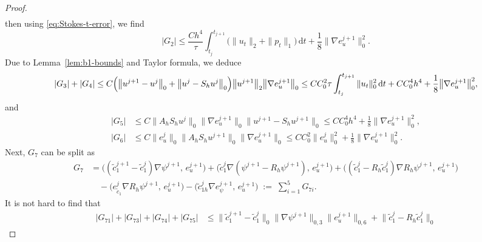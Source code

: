 \begin{proof}
\begin{align}
\end{align}
then using \eqref{eq:Stokes-t-error}, we find
\begin{equation}\label{eq:G2}
  |G_{2}| \leq \frac{Ch^{4}}{\tau}\int_{t_{j}}^{t_{j+1}}
               \bigl(\|u_{t}\|_{2} + \|p_{t}\|_{1}\bigr)\,\mathrm{d}t
             + \frac{1}{8}\bigl\|\nabla e_{u}^{j+1}\bigr\|_{0}^{2}.
\end{equation}
Due to Lemma~\ref{lem:b1-bounds} and Taylor formula, we deduce
\begin{equation}\label{eq:G3G4}
  |G_{3}| + |G_{4}|
  \leq C\Bigl(\bigl\|u^{j+1}-u^{j}\bigr\|_{0} + \bigl\|u^{j} - S_{h}u^{j}\bigr\|_{0}\Bigr)
        \bigl\|u^{j+1}\bigr\|_{2}\bigl\|\nabla e_{u}^{j+1}\bigr\|_{0}
  \leq CC_{0}^{2}\tau\int_{t_{j}}^{t_{j+1}}\|u_{t}\|_{0}^{2}\,\mathrm{d}t
     + CC_{0}^{4}h^{4}
     + \frac{1}{8}\bigl\|\nabla e_{u}^{j+1}\bigr\|_{0}^{2},
\end{equation}
and
\begin{align}
  |G_{5}| &\leq C\|A_{h}S_{h}u^{j}\|_{0}\bigl\|\nabla e_{u}^{j+1}\bigr\|_{0}
                  \bigl\|u^{j+1} - S_{h}u^{j+1}\bigr\|_{0}
           \leq CC_{0}^{4}h^{4} + \frac{1}{8}\bigl\|\nabla e_{u}^{j+1}\bigr\|_{0}^{2},
  \label{eq:G5}\\[4pt]
  |G_{6}| &\leq C\bigl\|e_{u}^{j}\bigr\|_{0}\|A_{h}S_{h}u^{j+1}\|_{0}
                  \bigl\|\nabla e_{u}^{j+1}\bigr\|_{0}
           \leq CC_{0}^{2}\bigl\|e_{u}^{j}\bigr\|_{0}^{2}
              + \frac{1}{8}\bigl\|\nabla e_{u}^{j+1}\bigr\|_{0}^{2}.
  \label{eq:G6}
\end{align}
Next, $G_{7}$ can be split as
\begin{align}
  G_{7} &= \bigl((\tilde{c}_{1}^{j+1} - \tilde{c}_{1}^{j})\nabla\psi^{j+1},\, e_{u}^{j+1}\bigr)
          + \bigl(\tilde{c}_{1}^{j}\nabla(\psi^{j+1} - R_{h}\psi^{j+1}),\, e_{u}^{j+1}\bigr)
          + \bigl((\tilde{c}_{1}^{j} - R_{h}\tilde{c}_{1}^{j})\nabla R_{h}\psi^{j+1},\, e_{u}^{j+1}\bigr)
  \nonumber\\
  &\quad - \bigl(e_{\tilde{c}_{1}}^{j}\nabla R_{h}\psi^{j+1},\, e_{u}^{j+1}\bigr)
          - \bigl(\tilde{c}_{1h}^{j}\nabla e_{\psi}^{j+1},\, e_{u}^{j+1}\bigr)
         \;:=\; \sum_{i=1}^{5}G_{7i}.
  \label{eq:G7-split}
\end{align}
It is not hard to find that
\begin{align}
  |G_{71}| + |G_{73}| + |G_{74}| + |G_{75}|
  &\leq \bigl\|\tilde{c}_{1}^{j+1} - \tilde{c}_{1}^{j}\bigr\|_{0}
         \bigl\|\nabla\psi^{j+1}\bigr\|_{0,3}\bigl\|e_{u}^{j+1}\bigr\|_{0,6}
       + \bigl\|\tilde{c}_{1}^{j} - R_{h}\tilde{c}_{1}^{j}\bigr\|_{0}

\end{align}
\end{proof}
